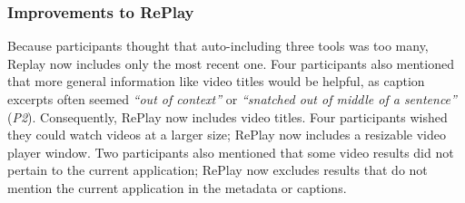 \subsubsection{Improvements to RePlay}
Because participants thought that auto-including three tools was too many, Replay now includes only the most recent one. Four participants also mentioned that more general information like video titles would be helpful, as caption excerpts often seemed \textit{``out of context''} or \textit{``snatched out of middle of a sentence''} (\textit{P2}). Consequently, RePlay now includes video titles. Four participants wished they could watch videos at a larger size; RePlay now includes a resizable video player window. Two participants also mentioned that some video results did not pertain to the current application; RePlay now excludes results that do not mention the current application in the metadata or captions.
